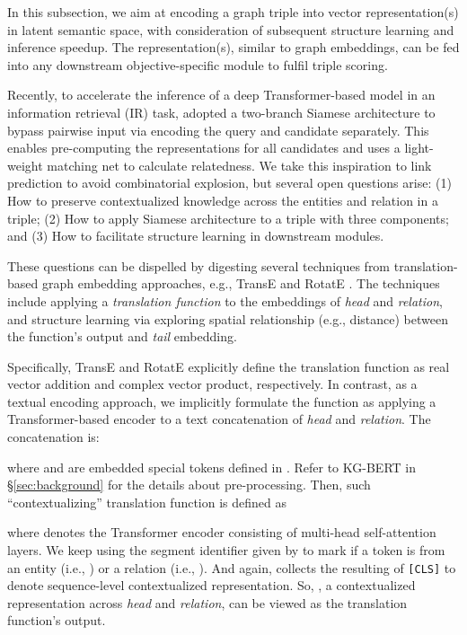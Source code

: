 \documentclass[sigconf]{acmart}
\begin{document}
In this subsection, we aim at encoding a graph triple into vector representation(s) in latent semantic space, with consideration of subsequent structure learning and inference speedup. 
The representation(s), similar to graph embeddings, can be fed into any downstream objective-specific module to fulfil triple scoring. 

Recently, to accelerate the inference of a deep Transformer-based model \cite{transformer,BERT} in an information retrieval (IR) task, \citet{reimers2019sentbert} adopted a two-branch Siamese architecture \cite{Chopra2015siamese} to bypass pairwise input via encoding the query and candidate separately. 
This enables pre-computing the representations for all candidates and uses a light-weight matching net \cite{reimers2019sentbert} to calculate relatedness. 
We take this inspiration to link prediction to avoid combinatorial explosion, but several open questions arise: 
(1) How to preserve contextualized knowledge across the entities and relation in a triple; 
(2) How to apply Siamese architecture to a triple with three components; 
and (3) How to facilitate structure learning in downstream modules. 


These questions can be dispelled by digesting several techniques from translation-based graph embedding approaches, e.g., TransE \cite{TransE} and RotatE \cite{sun2019rotate}. 
The techniques include applying a \textit{translation function} to the embeddings of \textit{head} and \textit{relation}, 
and structure learning via exploring spatial relationship (e.g., distance) between the function's output and \textit{tail} embedding. 

Specifically, TransE and RotatE explicitly define the translation function as real vector addition and complex vector product, respectively. 
In contrast, as a textual encoding approach, we implicitly formulate the function as applying a Transformer-based encoder to a text concatenation of \textit{head} and \textit{relation}. The concatenation is:

where  and  are embedded special tokens defined in \cite{BERT}. 
Refer to KG-BERT in \S\ref{sec:background} for the details about pre-processing. 
Then, such ``contextualizing'' translation function is defined as 

where  denotes the Transformer encoder consisting of multi-head self-attention layers\cite{transformer}.
We keep using the segment identifier given by \citet{BERT} to mark if a token is from an entity (i.e., ) or a relation (i.e., ). And again,  collects the resulting of \texttt{[CLS]} to denote sequence-level contextualized representation. 
So, , a contextualized representation across \textit{head} and \textit{relation}, can be viewed as the translation function's output. 
\end{document}
